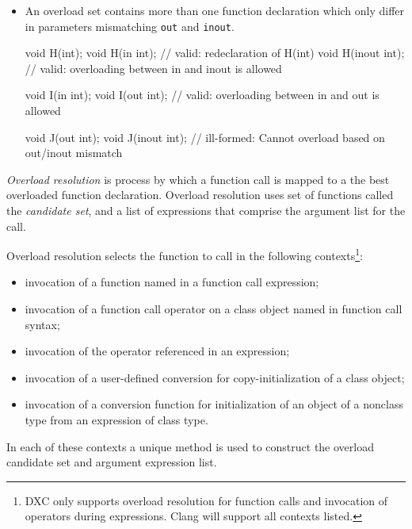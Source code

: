 \begin{itemize}
  \item An overload set contains more than one function declaration which only
  differ in parameters mismatching \texttt{out} and \texttt{inout}.
\begin{HLSL}
void H(int);
void H(in int);            // valid: redeclaration of H(int)
void H(inout int);         // valid: overloading between in and inout is allowed

void I(in int);
void I(out int);           // valid: overloading between in and out is allowed

void J(out int);
void J(inout int);         // ill-formed: Cannot overload based on out/inout mismatch
\end{HLSL}
\end{itemize}


\p \textit{Overload resolution} is process by which a function call is mapped to
a the best overloaded function declaration. Overload resolution uses set of
functions called the \textit{candidate set}, and a list of expressions that
comprise the argument list for the call.

\p Overload resolution selects the function to call in the following
contexts\footnote{DXC only supports overload resolution for function calls and
invocation of operators during expressions. Clang will support all contexts
listed.}:

\begin{itemize}
  \item invocation of a function named in a function call expression;
  \item invocation of a function call operator on a class object named in
  function call syntax;
  \item invocation of the operator referenced in an expression;
  \item invocation of a user-defined conversion for copy-initialization of a
  class object;
  \item invocation of a conversion function for initialization of an object of a
  nonclass type from an expression of class type.
\end{itemize}

\p In each of these contexts a unique method is used to construct the overload
candidate set and argument expression list.


